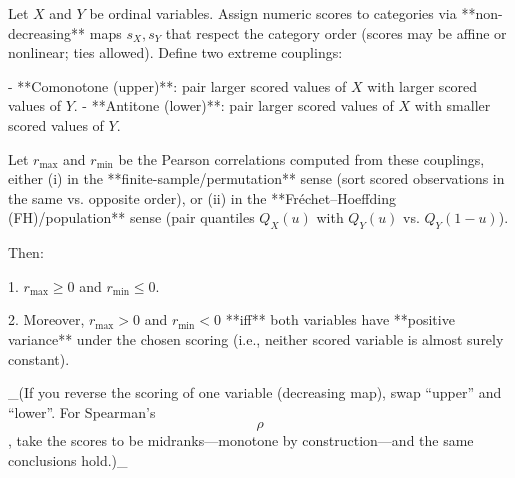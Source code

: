 \documentclass[
  12pt,
]{article}
\theoremstyle{plain}
\theoremstyle{definition}
\theoremstyle{remark}
\begin{document}
\label{prop-max-product}
\begin{lemma}

Let $X$ and $Y$ be ordinal variables. Assign numeric scores to categories via **non-decreasing** maps $s_X, s_Y$ that respect the category order (scores may be affine or nonlinear; ties allowed). Define two extreme couplings:

- **Comonotone (upper)**: pair larger scored values of $X$ with larger scored values of $Y$.
- **Antitone (lower)**: pair larger scored values of $X$ with smaller scored values of $Y$.
    

Let $r_{\max}$ and $r_{\min}$ be the Pearson correlations computed from these couplings, either (i) in the **finite-sample/permutation** sense (sort scored observations in the same vs. opposite order), or (ii) in the **Fréchet–Hoeffding (FH)/population** sense (pair quantiles $Q_X(u)$ with $Q_Y(u)$ vs. $Q_Y(1-u)$).

Then:

1. $r_{\max}\ge 0$ and $r_{\min}\le 0$.
    
2. Moreover, $r_{\max}>0$ and $r_{\min}<0$ **iff** both variables have **positive variance** under the chosen scoring (i.e., neither scored variable is almost surely constant).
    

_(If you reverse the scoring of one variable (decreasing map), swap “upper” and “lower”. For Spearman’s $$\rho$$, take the scores to be midranks—monotone by construction—and the same conclusions hold.)_
\end{lemma}
\end{document}
